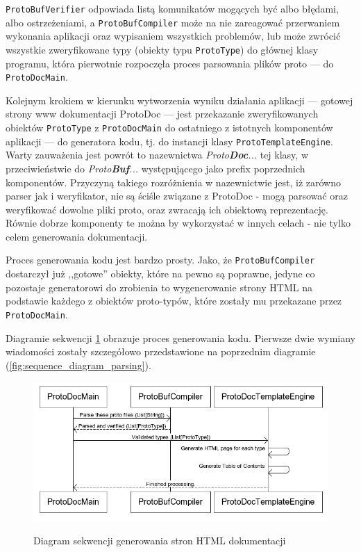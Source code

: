 \documentclass[pdflatex,11pt]{aghdpl}
\begin{document}
\verb|ProtoBufVerifier| odpowiada listą komunikatów mogących być albo błędami, albo ostrzeżeniami, a \verb|ProtoBufCompiler| może na nie zareagować przerwaniem
wykonania aplikacji oraz wypisaniem wszystkich problemów, lub może zwrócić wszystkie zweryfikowane typy (obiekty typu \verb|ProtoType|) do głównej klasy programu,
która pierwotnie rozpoczęła proces parsowania plików proto --- do \verb|ProtoDocMain|.

Kolejnym krokiem w kierunku wytworzenia wyniku działania aplikacji --- gotowej strony www dokumentacji ProtoDoc --- jest 
przekazanie zweryfikowanych obiektów \verb|ProtoType| z \verb|ProtoDocMain| do ostatniego z istotnych komponentów aplikacji --- do generatora kodu, tj. 
do instancji klasy \verb|ProtoTemplateEngine|. Warty zauważenia jest powrót to nazewnictwa \textit{Proto\textbf{Doc}...} tej klasy, w przeciwieństwie do \textit{Proto\textbf{Buf}...}
występującego jako prefix poprzednich komponentów. Przyczyną takiego rozróżnienia w nazewnictwie jest, iż zarówno parser jak i weryfikator, nie są ściśle związane
z ProtoDoc - mogą parsować oraz weryfikować dowolne pliki proto, oraz zwracają ich obiektową reprezentację. Równie dobrze komponenty te można by wykorzystać
w innych celach - nie tylko celem generowania dokumentacji. 

Proces generowania kodu jest bardzo prosty. Jako, że \verb|ProtoBufCompiler| dostarczył już ,,gotowe'' obiekty, które na pewno są poprawne, jedyne co pozostaje
generatorowi do zrobienia to wygenerowanie strony HTML na podstawie każdego z obiektów proto-typów, które zostały mu przekazane przez \verb|ProtoDocMain|.

Diagramie sekwencji \ref{fig:generate_html_seq} obrazuje proces generowania kodu. Pierwsze dwie wymiany wiadomości zostały szczegółowo 
przedstawione na poprzednim diagramie (\ref{fig:sequence_diagram_parsing}).

\begin{figure}[ch]
\begin{center}
 \includegraphics[scale=0.75]{generate_html_seq}
\label{fig:generate_html_seq}
\end{center}
\caption{Diagram sekwencji generowania stron HTML dokumentacji}
\end{figure}
\end{document}
